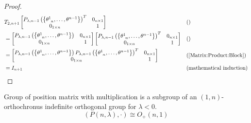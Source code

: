 \documentclass[../main.tex]{subfiles}
\begin{document}
\begin{proof}
\begin{align*}
&
T_{2,n+1}
\begin{bmatrix}
P_{\lambda,n-1}\left(\left\{\tensor{\theta}{^1_{n}},\dots,\tensor{\theta}{^{n-1}}\right\}\right)^T&0_{n\times 1}\\
0_{1\times n}&1\\
\end{bmatrix}
&&\text{()}\\
&=
\begin{bmatrix}
P_{\lambda,n-1}\left(\left\{\tensor{\theta}{^1_{n}},\dots,\tensor{\theta}{^{n-1}}\right\}\right)&0_{n\times 1}\\
0_{1\times n}&1\\
\end{bmatrix}
\begin{bmatrix}
P_{\lambda,n-1}\left(\left\{\tensor{\theta}{^1_{n}},\dots,\tensor{\theta}{^{n-1}}\right\}\right)^T&0_{n\times 1}\\
0_{1\times n}&1\\
\end{bmatrix}&&\text{()}\\
&=
\begin{bmatrix}
P_{\lambda,n-1}\left(\left\{\tensor{\theta}{^1_{n}},\dots,\tensor{\theta}{^{n-1}}\right\}\right)P_{\lambda,n-1}\left(\left\{\tensor{\theta}{^1_{n}},\dots,\tensor{\theta}{^{n-1}}\right\}\right)^T&0_{n\times 1}\\
0_{1\times n}&1\\
\end{bmatrix}&&\text{(\cref{Matrix:Product:Block})}\\
&=I_{n+1}&&\text{(mathematical induction)}
\end{align*}
\end{proof}
\begin{proposition}
Group of position matrix with multiplication is a subgroup of an $\left(1,n\right)$-orthochronus indefinite orthogonal group for $\lambda<0$.
\begin{equation*}
\left(P\left(n,\lambda\right),\cdot\right)\cong O_+\left(n,1\right)
\end{equation*}
\end{proposition}
\end{document}
